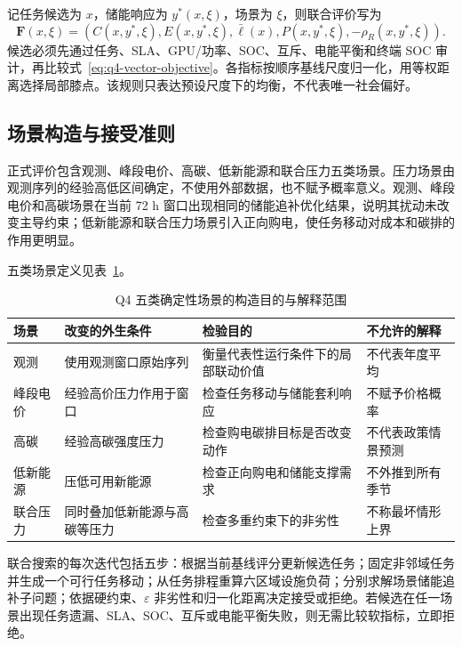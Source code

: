 记任务候选为 $x$，储能响应为 $y^*(x,\xi)$，场景为 $\xi$，则联合评价写为
\begin{equation}
  \boldsymbol F(x,\xi)=
  \left(C(x,y^*,\xi),E(x,y^*,\xi),\bar\ell(x),P(x,y^*,\xi),-\rho_R(x,y^*,\xi)\right).
  \label{eq:q4-vector-objective}
\end{equation}
候选必须先通过任务、SLA、GPU/功率、SOC、互斥、电能平衡和终端 SOC 审计，再比较式~\eqref{eq:q4-vector-objective}。各指标按顺序基线尺度归一化，用等权距离选择局部膝点。该规则只表达预设尺度下的均衡，不代表唯一社会偏好。

\subsection{场景构造与接受准则}

正式评价包含观测、峰段电价、高碳、低新能源和联合压力五类场景。压力场景由观测序列的经验高低区间确定，不使用外部数据，也不赋予概率意义。观测、峰段电价和高碳场景在当前 72 h 窗口出现相同的储能追补优化结果，说明其扰动未改变主导约束；低新能源和联合压力场景引入正向购电，使任务移动对成本和碳排的作用更明显。

五类场景定义见表~\ref{tab:q4-scenario-definition}。

\begin{table}[H]
  \centering
  \caption{Q4 五类确定性场景的构造目的与解释范围}
  \label{tab:q4-scenario-definition}
  \small
  \begin{tabularx}{\textwidth}{p{}p{}p{}X}
    \toprule
    场景 & 改变的外生条件 & 检验目的 & 不允许的解释 \\
    \midrule
    观测 & 使用观测窗口原始序列 & 衡量代表性运行条件下的局部联动价值 & 不代表年度平均 \\
    峰段电价 & 经验高价压力作用于窗口 & 检查任务移动与储能套利响应 & 不赋予价格概率 \\
    高碳 & 经验高碳强度压力 & 检查购电碳排目标是否改变动作 & 不代表政策情景预测 \\
    低新能源 & 压低可用新能源 & 检查正向购电和储能支撑需求 & 不外推到所有季节 \\
    联合压力 & 同时叠加低新能源与高碳等压力 & 检查多重约束下的非劣性 & 不称最坏情形上界 \\
    \bottomrule
  \end{tabularx}
\end{table}

联合搜索的每次迭代包括五步：根据当前基线评分更新候选任务；固定非邻域任务并生成一个可行任务移动；从任务排程重算六区域设施负荷；分别求解场景储能追补子问题；依据硬约束、$\varepsilon$ 非劣性和归一化距离决定接受或拒绝。若候选在任一场景出现任务遗漏、SLA、SOC、互斥或电能平衡失败，则无需比较软指标，立即拒绝。

